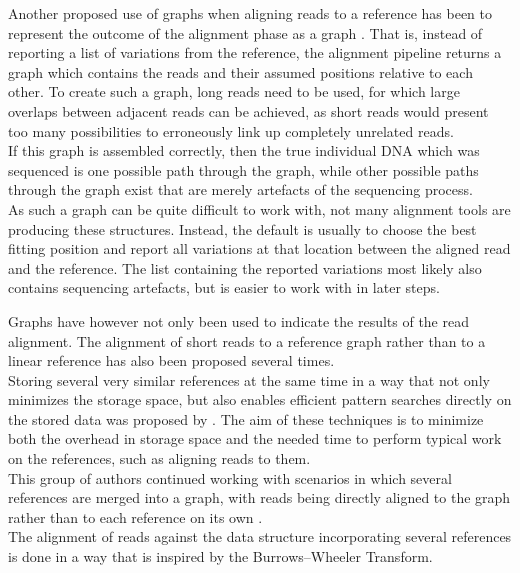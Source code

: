 \documentclass[a4paper,12pt,twoside,BCOR=10mm]{scrbook}
\begin{document}
Another proposed use of graphs when aligning reads to a reference
has been to represent the outcome of the alignment phase as a graph \citet{Myers2005}.
That is, instead of reporting a list of variations from the reference,
the alignment pipeline returns a graph which contains the reads and their assumed positions
relative to each other.
To create such a graph, long reads need to be used, for which large overlaps
between adjacent reads can be achieved, as short reads would present too many
possibilities to erroneously link up completely unrelated reads. \\
If this graph is assembled correctly, then the true individual DNA which was sequenced
is one possible path through the graph,
while other possible paths through the graph exist that are merely artefacts of the sequencing process. \\
As such a graph can be quite difficult to work with, not many alignment tools are producing these
structures. Instead, the default is usually to choose the best fitting position and
report all variations at that location between the aligned read and the reference.
The list containing the reported variations most likely also contains sequencing artefacts,
but is easier to work with in later steps.

Graphs have however not only been used to indicate the results of the read alignment.
The alignment of short reads to a reference graph rather than to a linear reference has
also been proposed several times. \\
Storing several very similar references at the same time in a way that not only minimizes
the storage space, but also enables efficient pattern searches directly on the
stored data was proposed by \citet{Makinen2010}.
The aim of these techniques is to
minimize both the overhead in storage space and the needed time to perform typical work
on the references, such as aligning reads to them. \\
This group of authors continued working with scenarios in which
several references are merged into a graph, with reads being directly
aligned to the graph rather than to each reference on its own \citep{Siren2014}. \\
The alignment of reads against the data structure incorporating several references
is done in a way that is inspired by the Burrows--Wheeler Transform.
\end{document}
